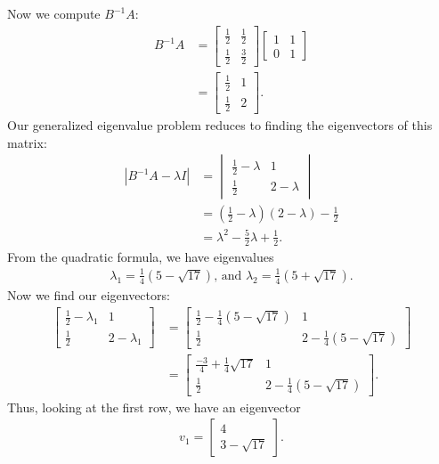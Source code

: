 \documentclass[10pt,a4paper]{article}
\theoremstyle{definition}
\begin{document}
Now we compute $B^{-1} A$:
\begin{align*}
B^{-1} A &= \begin{bmatrix}
\frac{1}{2} & \frac{1}{2}\\
\frac{1}{2} & \frac{3}{2}
\end{bmatrix} \begin{bmatrix}
1 & 1\\
0 & 1
\end{bmatrix}\\
&= \begin{bmatrix}
\frac{1}{2} & 1\\
\frac{1}{2} & 2
\end{bmatrix}.
\end{align*}
Our generalized eigenvalue problem reduces to finding the eigenvectors of this matrix:
\begin{align*}
|B^{-1} A - \lambda I| &= \begin{vmatrix}
\frac{1}{2} - \lambda & 1\\
\frac{1}{2} & 2 - \lambda
\end{vmatrix}\\
&= (\frac{1}{2} - \lambda)(2 - \lambda) - \frac{1}{2}\\
&= \lambda^2 - \frac{5}{2} \lambda + \frac{1}{2}.
\end{align*}
From the quadratic formula, we have eigenvalues
\begin{align*}
\lambda_1 = \frac{1}{4}(5 - \sqrt{17}) \text{, and } \lambda_2 = \frac{1}{4}(5 + \sqrt{17}).
\end{align*}
Now we find our eigenvectors:
\begin{align*}
\begin{bmatrix}
\frac{1}{2} - \lambda_1 & 1\\
\frac{1}{2} & 2 - \lambda_1
\end{bmatrix} &= \begin{bmatrix} \frac{1}{2} - \frac{1}{4}(5 - \sqrt{17}) & 1\\
\frac{1}{2} & 2 - \frac{1}{4}(5 - \sqrt{17})
\end{bmatrix}\\ 
&= \begin{bmatrix} \frac{-3}{4} + \frac{1}{4}\sqrt{17} & 1\\
\frac{1}{2} & 2 - \frac{1}{4}(5 - \sqrt{17})
\end{bmatrix}.
\end{align*}
Thus, looking at the first row, we have an eigenvector
\begin{align*}
v_1 = \begin{bmatrix}
4\\
3 - \sqrt{17}
\end{bmatrix}.
\end{align*}
\end{document}

